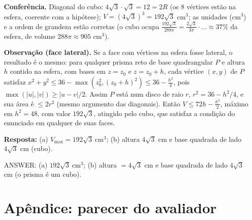 \documentclass{article}%
\begin{document}
\textbf{Conferência.} Diagonal do cubo: $4\sqrt3\cdot\sqrt3=12=2R$ (os 8 vértices estão na esfera, coerente com a hipótese); $V=(4\sqrt3)^3=192\sqrt3$ cm$^3$; as unidades (cm$^3$) e a ordem de grandeza estão corretas (o cubo ocupa $\frac{192\sqrt3}{288\pi}=\frac{2\sqrt3}{3\pi}\cdot\!\ldots\approx 37\%$ da esfera, de volume $288\pi\approx 905$ cm$^3$).

\textbf{Observação (face lateral).} Se a face com vértices na esfera fosse lateral, o resultado é o mesmo: para qualquer prisma reto de base quadrangular $P$ e altura $h$ contido na esfera, com bases em $z=z_0$ e $z=z_0+h$, cada vértice $(x,y)$ de $P$ satisfaz $x^2+y^2\le 36-\max(z_0^2,(z_0+h)^2)\le 36-\tfrac{h^2}{4}$, pois $\max(|u|,|v|)\ge |u-v|/2$. Assim $P$ está num disco de raio $r$, $r^2=36-h^2/4$, e sua área é $\le 2r^2$ (mesmo argumento das diagonais). Então $V\le 72h-\tfrac{h^3}{2}$, máximo em $h^2=48$, com valor $192\sqrt3$, atingido pelo cubo, que satisfaz a condição do enunciado em qualquer de suas faces.

\bigskip
\textbf{Resposta:} (a) $V_{\max}=192\sqrt3\ \text{cm}^3$; (b) altura $4\sqrt3$ cm e base quadrada de lado $4\sqrt3$ cm (cubo).

ANSWER: (a) $192\sqrt{3}\ \text{cm}^3$; (b) altura $=4\sqrt{3}$ cm e base quadrada de lado $4\sqrt{3}$ cm (o prisma é um cubo).
%
\newpage%
\section*{Apêndice: parecer do avaliador}%
\end{document}
